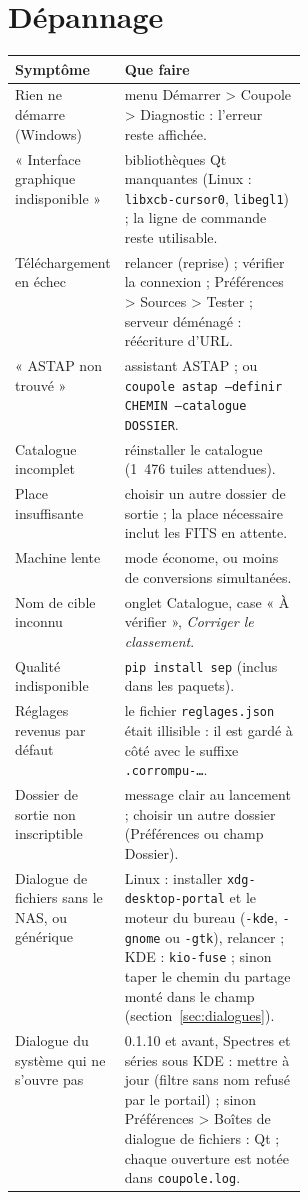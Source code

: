 \section{Dépannage}
\begin{center}\small
\begin{tabularx}{\linewidth}{@{}>{\raggedright}p{0.34\linewidth}X@{}}
\toprule
\textbf{Symptôme} & \textbf{Que faire}\\
\midrule
Rien ne démarre (Windows) & menu Démarrer > Coupole > Diagnostic : l'erreur reste affichée.\\
« Interface graphique indisponible » & bibliothèques Qt manquantes (Linux : \texttt{libxcb-cursor0}, \texttt{libegl1}) ; la ligne de commande reste utilisable.\\
Téléchargement en échec & relancer (reprise) ; vérifier la connexion ; Préférences > Sources > Tester ; serveur déménagé : réécriture d'URL.\\
« ASTAP non trouvé » & assistant ASTAP ; ou \texttt{coupole astap --definir CHEMIN --catalogue DOSSIER}.\\
Catalogue incomplet & réinstaller le catalogue (1~476 tuiles attendues).\\
Place insuffisante & choisir un autre dossier de sortie ; la place nécessaire inclut les FITS en attente.\\
Machine lente & mode économe, ou moins de conversions simultanées.\\
Nom de cible inconnu & onglet Catalogue, case « À vérifier », \emph{Corriger le classement}.\\
Qualité indisponible & \texttt{pip install sep} (inclus dans les paquets).\\
Réglages revenus par défaut & le fichier \texttt{reglages.json} était illisible : il est gardé à côté avec le suffixe \texttt{.corrompu-…}.\\
Dossier de sortie non inscriptible & message clair au lancement ; choisir un autre dossier (Préférences ou champ Dossier).\\
Dialogue de fichiers sans le NAS, ou générique & Linux : installer \texttt{xdg-desktop-portal} et le moteur du bureau (\texttt{-kde}, \texttt{-gnome} ou \texttt{-gtk}), relancer ; KDE : \texttt{kio-fuse} ; sinon taper le chemin du partage monté dans le champ (section~\ref{sec:dialogues}).\\
Dialogue du système qui ne s'ouvre pas & 0.1.10 et avant, Spectres et séries sous KDE : mettre à jour (filtre sans nom refusé par le portail) ; sinon Préférences > Boîtes de dialogue de fichiers : Qt ; chaque ouverture est notée dans \texttt{coupole.log}.\\

\end{tabularx}
\end{center}
